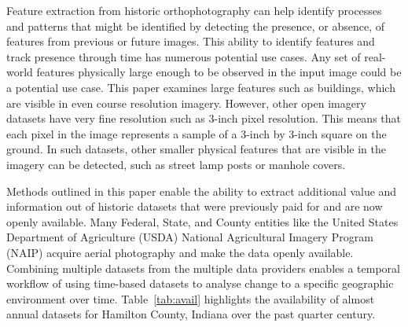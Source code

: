 \documentclass[acmtog, authorversion]{acmart}
\begin{document}
Feature extraction from historic orthophotography can help identify processes and patterns that might be identified by detecting the presence, or absence, of features from previous or future images.  This ability to identify features and track presence through time has numerous potential use cases.  Any set of real-world features physically large enough to be observed in the input image could be a potential use case.  This paper examines large features such as buildings, which are visible in even course resolution imagery.  However, other open imagery datasets have very fine resolution such as 3-inch pixel resolution.  This means that each pixel in the image represents a sample of a 3-inch by 3-inch square on the ground.    In such datasets, other smaller physical features that are visible in the imagery can be detected, such as street lamp posts or manhole covers.  

Methods outlined in this paper enable the ability to extract additional value and information out of historic datasets that were previously paid for and are now openly available.  Many Federal, State, and County entities like the United States Department of Agriculture (USDA) National Agricultural Imagery Program (NAIP) acquire aerial photography and make the data openly available.  Combining multiple datasets from the multiple data providers enables a temporal workflow of using time-based datasets to analyse change to a specific geographic environment over time. Table~\ref{tab:avail}  highlights the availability of almost annual datasets for Hamilton County, Indiana over the past quarter century.         
\end{document}
